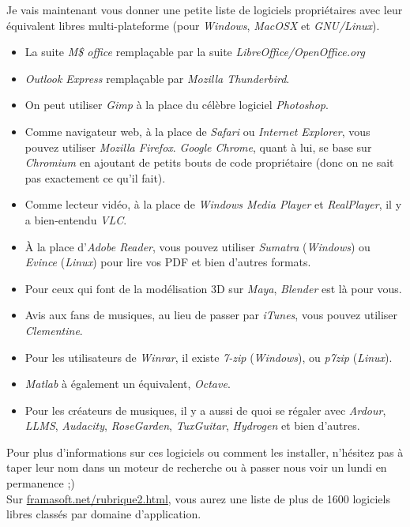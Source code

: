 Je vais maintenant vous donner une petite liste de logiciels propriétaires avec leur équivalent libres multi-plateforme (pour \textit{Windows}, \textit{MacOSX} et \textit{GNU/Linux}). %
\begin{itemize}
	\item La suite \textit{M\$ office} remplaçable par la suite \textit{LibreOffice/OpenOffice.org}
	\item \textit{Outlook Express} remplaçable par \textit{Mozilla Thunderbird}.
	\item On peut utiliser \textit{Gimp} à la place du célèbre logiciel \textit{Photoshop}.
	\item Comme navigateur web, à la place de \textit{Safari} ou \textit{Internet Explorer}, vous pouvez utiliser \textit{Mozilla Firefox}. \textit{Google Chrome}, quant à lui, se base sur \textit{Chromium} en ajoutant de petits bouts de code propriétaire (donc on ne sait pas exactement ce qu'il fait).
	\item Comme lecteur vidéo, à la place de \textit{Windows Media Player} et \textit{RealPlayer}, il y a bien-entendu \textit{VLC}.
	\item À la place d'\textit{Adobe Reader}, vous pouvez utiliser \textit{Sumatra} (\textit{Windows}) ou \textit{Evince} (\textit{Linux}) pour lire vos PDF et bien d'autres formats. %
	\item Pour ceux qui font de la modélisation 3D sur \textit{Maya}, \textit{Blender} est là pour vous.
	\item Avis aux fans de musiques, au lieu de passer par \textit{iTunes}, vous pouvez utiliser \textit{Clementine}. %
	\item Pour les utilisateurs de \textit{Winrar}, il existe \textit{7-zip} (\textit{Windows}), ou \textit{p7zip} (\textit{Linux}).
	\item \textit{Matlab} à également un équivalent, \textit{Octave}.
	\item Pour les créateurs de musiques, il y a aussi de quoi se régaler avec \textit{Ardour}, \textit{LLMS}, \textit{Audacity}, \textit{RoseGarden}, \textit{TuxGuitar}, \textit{Hydrogen} et bien d'autres.
\end{itemize}
Pour plus d'informations sur ces logiciels ou comment les installer, n'hésitez pas à taper leur nom dans un moteur de recherche ou à passer nous voir un lundi en permanence ;)\\
Sur \url{framasoft.net/rubrique2.html}, vous aurez une liste de plus de 1600 logiciels libres classés par domaine d'application.





	
